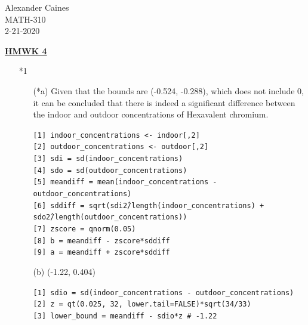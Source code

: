 \documentclass[12pt]{article}
\begin{document}
\vspace{1.0 \baselineskip}

\begin{flushright}
	Alexander Caines\\
	MATH-310\\
	2-21-2020\\
\end{flushright}

\begin{center}
	\textbf{\underline{HMWK 4}}
\end{center}



\begin{enumerate}
	\item[*1]
		\begin{enumerate}
			\item[(*a)] Given that the bounds are  (-0.524, -0.288), which does not include 0, 
				it can be concluded that there is indeed a significant difference between the 
				indoor and outdoor concentrations of Hexavalent chromium.
				\begin{tcolorbox}[colback=white]
					\texttt{[1] indoor\_concentrations <- indoor[,2]}\\
					\texttt{[2] outdoor\_concentrations <- outdoor[,2]}\\
					\texttt{[3] sdi = sd(indoor\_concentrations)}\\
					\texttt{[4] sdo = sd(outdoor\_concentrations)}\\
					\texttt{[5] meandiff = mean(indoor\_concentrations - outdoor\_concentrations)}\\
					\texttt{[6] sddiff = sqrt(sdi\^2/length(indoor\_concentrations) + sdo\^2/length(outdoor\_concentrations))}\\
					\texttt{[7] zscore = qnorm(0.05)}\\
					\texttt{[8] b = meandiff - zscore*sddiff}\\
					\texttt{[9] a = meandiff + zscore*sddiff}
				\end{tcolorbox}
			\item[(b)] (-1.22, 0.404)
				\begin{tcolorbox}[colback=white]
					\texttt{[1] sdio = sd(indoor\_concentrations - outdoor\_concentrations)}\\
					\texttt{[2] z = qt(0.025, 32, lower.tail=FALSE)*sqrt(34/33)}\\
					\texttt{[3] lower\_bound = meandiff - sdio*z \# -1.22}\\

\end{tcolorbox}
\end{enumerate}
\end{enumerate}
\end{document}
